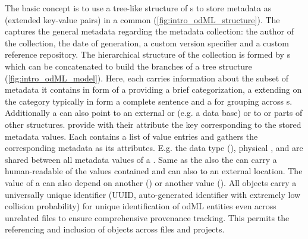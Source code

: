 The basic concept is to use a tree-like structure of s to store metadata as  (extended key-value pairs) in a common  (\cref{fig:intro_odML_structure}). The  captures the general metadata regarding the metadata collection: the author of the collection, the date of generation, a custom version specifier and a custom reference repository. The hierarchical structure of the collection is formed by s which can be concatenated to build the branches of a tree structure (\cref{fig:intro_odML_model}). Here, each  carries information about the subset of metadata it contains in form of a   providing a brief categorization, a  extending on the category typically in form a complete sentence and a  for grouping across s. Additionally a  can also point to an external  or  (e.g. a data base) or  to or  parts of other  structures.  provide with their  attribute the key corresponding to the stored metadata values. Each  contains a list of value entries and gathers the corresponding metadata as its  attributes. E.g. the data type (), physical ,  and  are shared between all metadata values of a . Same as the  also the  can carry a human-readable  of the values contained and can also  to an external location. The value of a  can also depend on another  () or another  value (). All  objects carry a universally unique identifier (UUID, auto-generated identifier with extremely low collision probability) for unique identification of odML entities even across unrelated files to ensure comprehensive provenance tracking. This permits the referencing and inclusion of  objects across files and projects.\\

